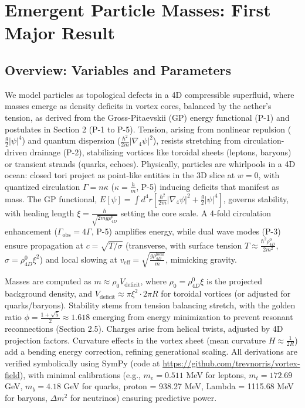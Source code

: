 \section{Emergent Particle Masses: First Major Result}

\subsection{Overview: Variables and Parameters}

We model particles as topological defects in a 4D compressible superfluid, where masses emerge as density deficits in vortex cores, balanced by the aether's tension, as derived from the Gross-Pitaevskii (GP) energy functional (P-1) and postulates in Section 2 (P-1 to P-5). Tension, arising from nonlinear repulsion (\(\frac{g}{2} |\psi|^4\)) and quantum dispersion (\(\frac{\hbar^2}{2m} |\nabla_4 \psi|^2\)), resists stretching from circulation-driven drainage (P-2), stabilizing vortices like toroidal sheets (leptons, baryons) or transient strands (quarks, echoes). Physically, particles are whirlpools in a 4D ocean: closed tori project as point-like entities in the 3D slice at \(w=0\), with quantized circulation \(\Gamma = n \kappa\) (\(\kappa = \frac{h}{m}\), P-5) inducing deficits that manifest as mass. The GP functional, \(E[\psi] = \int d^4 r \left[ \frac{\hbar^2}{2 m} |\nabla_4 \psi|^2 + \frac{g}{2} |\psi|^4 \right]\), governs stability, with healing length \(\xi = \frac{\hbar}{\sqrt{2 m g \rho_{4D}^0}}\) setting the core scale. A 4-fold circulation enhancement (\(\Gamma_{\text{obs}} = 4\Gamma\), P-5) amplifies energy, while dual wave modes (P-3) ensure propagation at \(c = \sqrt{T / \sigma}\) (transverse, with surface tension \(T \approx \frac{\hbar^2 \rho_{4D}^0}{2 m^2}\), \(\sigma = \rho_{4D}^0 \xi^2\)) and local slowing at \(v_{\text{eff}} = \sqrt{\frac{g \rho_{4D}^{\text{local}}}{m}}\), mimicking gravity.

Masses are computed as \(m \approx \rho_0 V_{\text{deficit}}\), where \(\rho_0 = \rho_{4D}^0 \xi\) is the projected background density, and \(V_{\text{deficit}} \approx \pi \xi^2 \cdot 2\pi R\) for toroidal vortices (or adjusted for quarks/baryons). Stability stems from tension balancing stretch, with the golden ratio \(\phi = \frac{1 + \sqrt{5}}{2} \approx 1.618\) emerging from energy minimization to prevent resonant reconnections (Section 2.5). Charges arise from helical twists, adjusted by 4D projection factors. Curvature effects in the vortex sheet (mean curvature \(H \approx \frac{1}{2R}\)) add a bending energy correction, refining generational scaling. All derivations are verified symbolically using SymPy (code at \url{https://github.com/trevnorris/vortex-field}), with minimal calibrations (e.g., \(m_e = 0.511\) MeV for leptons, \(m_t = 172.69\) GeV, \(m_b = 4.18\) GeV for quarks, proton = 938.27 MeV, Lambda = 1115.68 MeV for baryons, \(\Delta m^2\) for neutrinos) ensuring predictive power.

